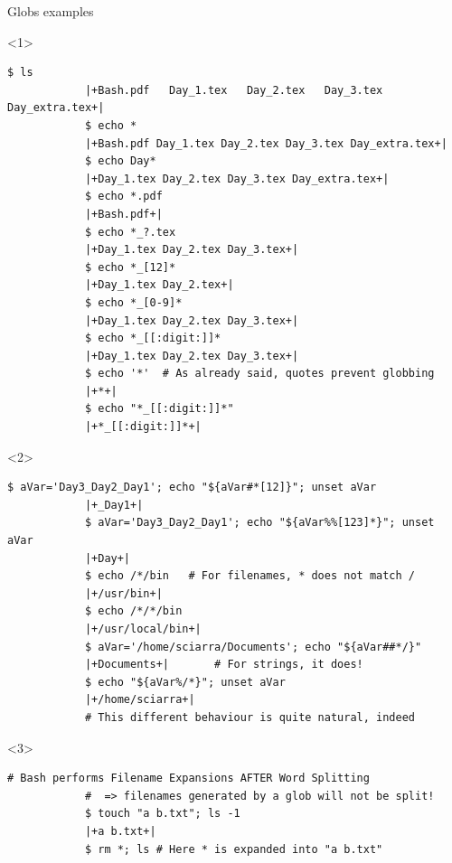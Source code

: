 \begin{frame}[fragile]{Globs examples}
    \vspace{-1mm}
    \begin{onlyenv}<1>
        \begin{lstlisting}[style=MyBash, style=oddnumbers, xleftmargin=3mm, xrightmargin=3mm]
            $ ls
            |+Bash.pdf   Day_1.tex   Day_2.tex   Day_3.tex   Day_extra.tex+|
            $ echo *
            |+Bash.pdf Day_1.tex Day_2.tex Day_3.tex Day_extra.tex+|
            $ echo Day*
            |+Day_1.tex Day_2.tex Day_3.tex Day_extra.tex+|
            $ echo *.pdf
            |+Bash.pdf+|
            $ echo *_?.tex
            |+Day_1.tex Day_2.tex Day_3.tex+|
            $ echo *_[12]*
            |+Day_1.tex Day_2.tex+|
            $ echo *_[0-9]*
            |+Day_1.tex Day_2.tex Day_3.tex+|
            $ echo *_[[:digit:]]*
            |+Day_1.tex Day_2.tex Day_3.tex+|
            $ echo '*'  # As already said, quotes prevent globbing
            |+*+|
            $ echo "*_[[:digit:]]*"
            |+*_[[:digit:]]*+|
        \end{lstlisting}
    \end{onlyenv}
    \begin{onlyenv}<2>
        \begin{lstlisting}[style=MyBash, style=oddnumbers, xleftmargin=3mm, xrightmargin=3mm, firstnumber=20]
            $ aVar='Day3_Day2_Day1'; echo "${aVar#*[12]}"; unset aVar
            |+_Day1+|
            $ aVar='Day3_Day2_Day1'; echo "${aVar%%[123]*}"; unset aVar
            |+Day+|
            $ echo /*/bin   # For filenames, * does not match /
            |+/usr/bin+|
            $ echo /*/*/bin
            |+/usr/local/bin+|
            $ aVar='/home/sciarra/Documents'; echo "${aVar##*/}"
            |+Documents+|       # For strings, it does!
            $ echo "${aVar%/*}"; unset aVar
            |+/home/sciarra+|
            # This different behaviour is quite natural, indeed
        \end{lstlisting}
    \end{onlyenv}
    \begin{onlyenv}<3>
        \begin{lstlisting}[style=MyBash, style=oddnumbers, xleftmargin=3mm, xrightmargin=3mm, firstnumber=32]
            # Bash performs Filename Expansions AFTER Word Splitting
            #  => filenames generated by a glob will not be split!
            $ touch "a b.txt"; ls -1
            |+a b.txt+|
            $ rm *; ls # Here * is expanded into "a b.txt"

\end{lstlisting}
\end{onlyenv}
\end{frame}
